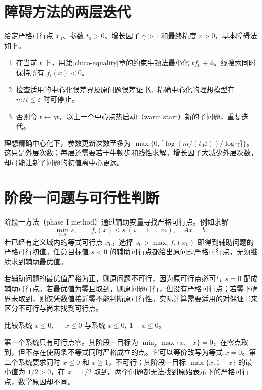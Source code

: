 \section{障碍方法的两层迭代}

给定严格可行点 $x_0$、参数 $t_0>0$、增长因子 $\gamma>1$ 和最终精度 $\varepsilon>0$，基本障碍法如下。
\begin{enumerate}
 \item 在当前 $t$ 下，用第\ref{ch:co-equality}章的约束牛顿法最小化 $tf_0+\phi$。线搜索同时保持所有 $f_i(x)<0$。
 \item 检查适用的中心化误差界及原问题误差证书。精确中心化的理想模型在 $m/t\leq\varepsilon$ 时可停止。
 \item 否则令 $t\leftarrow\gamma t$，以上一个中心点热启动（warm start）新的子问题，重复迭代。
\end{enumerate}
理想精确中心化下，参数更新次数至多为 $\max\{0,\lceil\log(m/(t_0\varepsilon))/\log\gamma\rceil\}$。这只是外层次数；每层还需要若干牛顿步和线性求解。增长因子大减少外层次数，却可能让新子问题的初值离中心更远。

\section{阶段一问题与可行性判断}

阶段一方法（phase I method）通过辅助变量寻找严格可行点。例如求解
\[
 \min_{x,s}s,\qquad f_i(x)\leq s\ (i=1,\ldots,m),\quad Ax=b.
\]
若已经有定义域内的等式可行点 $x_0$，选择 $s_0>\max_i f_i(x_0)$ 即得到辅助问题的严格可行初值。任意目标值 $s<0$ 的辅助可行点都给出原问题严格可行点，无须继续求到辅助最优值。

若辅助问题的最优值严格为正，则原问题不可行，因为原可行点必可与 $s=0$ 配成辅助可行点。若最优值为零且取到，则原问题可行，但没有严格可行点；若零下确界未取到，则仅凭数值接近零不能判断原可行性。实际计算需要适用的对偶证书来区分不可行与尚未找到可行点。

\begin{example}[阶段一中零与正数的区别]
比较系统 $x\leq0,\ -x\leq0$ 与系统 $x\leq0,\ 1-x\leq0$。
\end{example}
\begin{solve}
第一个系统只有可行点零。其阶段一目标为 $\min_x\max\{x,-x\}=0$，在零点取到，但不存在使两条不等式同时严格成立的点。它可以等价改写为等式 $x=0$。第二个系统要求同时 $x\leq0$ 和 $x\geq1$，不可行；其阶段一目标 $\max\{x,1-x\}$ 的最小值为 $1/2>0$，在 $x=1/2$ 取到。两个问题都无法找到原始表示下的严格可行点，数学原因却不同。
\end{solve}

